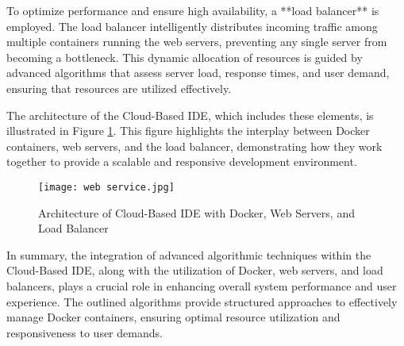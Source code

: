 \documentclass[12pt,a4paper,final]{report}
\begin{document}
To optimize performance and ensure high availability, a **load balancer** is employed. The load balancer intelligently distributes incoming traffic among multiple containers running the web servers, preventing any single server from becoming a bottleneck. This dynamic allocation of resources is guided by advanced algorithms that assess server load, response times, and user demand, ensuring that resources are utilized effectively.

The architecture of the Cloud-Based IDE, which includes these elements, is illustrated in Figure \ref{fig:web_service}. This figure highlights the interplay between Docker containers, web servers, and the load balancer, demonstrating how they work together to provide a scalable and responsive development environment.
\newpage
\begin{figure}[h]
    \centering
    \texttt{[image: web service.jpg]}
    \caption{Architecture of Cloud-Based IDE with Docker, Web Servers, and Load Balancer}
    \label{fig:web_service}
\end{figure}

In summary, the integration of advanced algorithmic techniques within the Cloud-Based IDE, along with the utilization of Docker, web servers, and load balancers, plays a crucial role in enhancing overall system performance and user experience. The outlined algorithms provide structured approaches to effectively manage Docker containers, ensuring optimal resource utilization and responsiveness to user demands.
\end{document}
